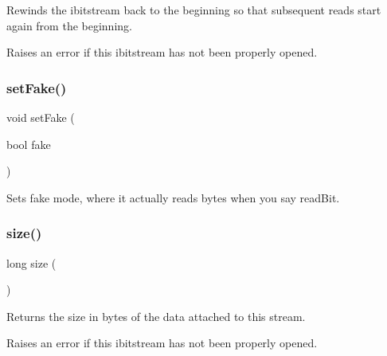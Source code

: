 Rewinds the ibitstream back to the beginning so that subsequent reads start again from the beginning. 

Raises an error if this ibitstream has not been properly opened. \mbox{\label{classibitstream_ad916b4624eb09d375514964f867b475c}} 
\subsubsection{\texorpdfstring{set\+Fake()}{setFake()}}
{\footnotesize\ttfamily void set\+Fake (\begin{DoxyParamCaption}\item[{bool}]{fake }\end{DoxyParamCaption})\hspace{0.3cm}{\ttfamily [inherited]}}



Sets \textquotesingle{}fake\textquotesingle{} mode, where it actually reads bytes when you say read\+Bit. 

\mbox{\label{classibitstream_a22727e9c338fb1aaa6722031445373c3}} 
\subsubsection{\texorpdfstring{size()}{size()}}
{\footnotesize\ttfamily long size (\begin{DoxyParamCaption}{ }\end{DoxyParamCaption})\hspace{0.3cm}{\ttfamily [inherited]}}



Returns the size in bytes of the data attached to this stream. 

Raises an error if this ibitstream has not been properly opened. 